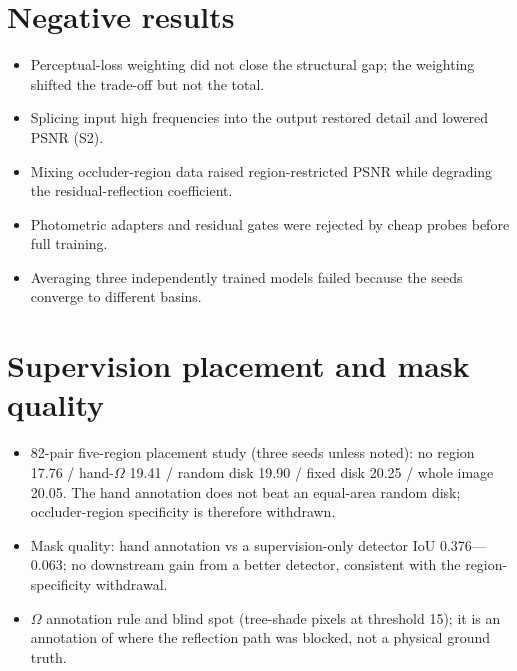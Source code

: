 \documentclass[10pt]{article}
\newcommand{\Om}{\Omega}
\begin{document}
\section{Negative results}\label{supp:negative}
\begin{itemize}
\item Perceptual-loss weighting did not close the structural gap; the weighting
  shifted the trade-off but not the total.
\item Splicing input high frequencies into the output restored detail and lowered
  PSNR (S2).
\item Mixing occluder-region data raised region-restricted PSNR while degrading the
  residual-reflection coefficient.
\item Photometric adapters and residual gates were rejected by cheap probes before
  full training.
\item Averaging three independently trained models failed because the seeds converge
  to different basins.
\end{itemize}

\section{Supervision placement and mask quality}\label{supp:placement}
\begin{itemize}
\item 82-pair five-region placement study (three seeds unless noted): no region
  17.76 / hand-$\Om$ 19.41 / random disk 19.90 / fixed disk 20.25 / whole image 20.05.
  The hand annotation does not beat an equal-area random disk; occluder-region
  specificity is therefore withdrawn.
\item Mask quality: hand annotation vs a supervision-only detector IoU 0.376—0.063;
  no downstream gain from a better detector, consistent with the region-specificity
  withdrawal.
\item $\Om$ annotation rule and blind spot (tree-shade pixels at threshold 15); it is
  an annotation of where the reflection path was blocked, not a physical ground truth.
\end{itemize}

\end{document}
